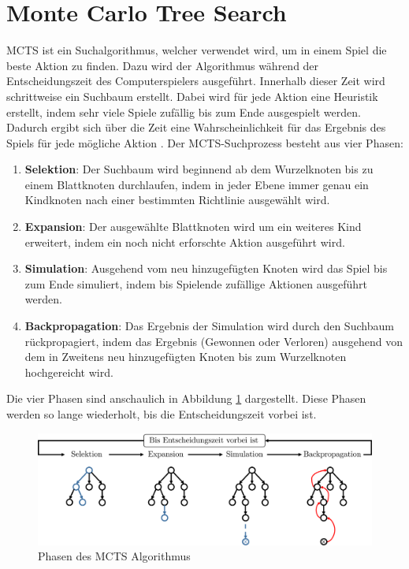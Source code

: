 \section{Monte Carlo Tree Search}
\label{chapter:monte-carlo-tree-search}

\acf{MCTS} ist ein Suchalgorithmus, welcher verwendet wird, um in einem Spiel die beste Aktion zu finden. Dazu wird der Algorithmus während der Entscheidungszeit des Computerspielers ausgeführt. Innerhalb dieser Zeit wird schrittweise ein Suchbaum erstellt. Dabei wird für jede Aktion eine Heuristik erstellt, indem sehr viele Spiele zufällig bis zum Ende ausgespielt werden. Dadurch ergibt sich über die Zeit eine Wahrscheinlichkeit für das Ergebnis des Spiels für jede mögliche Aktion \cite[S. 61]{2008.ParallelMCTS}. Der \ac{MCTS}-Suchprozess besteht aus vier Phasen:

\begin{enumerate}
    \item \textbf{Selektion}: Der Suchbaum wird beginnend ab dem Wurzelknoten bis zu einem Blattknoten durchlaufen, indem in jeder Ebene immer genau ein Kindknoten nach einer bestimmten Richtlinie ausgewählt wird. \cite[S. 187]{2018.ReinforcementLearning}
    \item \textbf{Expansion}: Der ausgewählte Blattknoten wird um ein weiteres Kind erweitert, indem ein noch nicht erforschte Aktion ausgeführt wird. \cite[S. 61]{2008.ParallelMCTS}
    \item \textbf{Simulation}: Ausgehend vom neu hinzugefügten Knoten wird das Spiel bis zum Ende simuliert, indem bis Spielende zufällige Aktionen ausgeführt werden. \cite[S. 61]{2008.ParallelMCTS}
    \item \textbf{Backpropagation}: Das Ergebnis der Simulation wird durch den Suchbaum rückpropagiert, indem das Ergebnis (Gewonnen oder Verloren) ausgehend von dem in Zweitens neu hinzugefügten Knoten bis zum Wurzelknoten hochgereicht wird. \cite[S. 187]{2018.ReinforcementLearning}
\end{enumerate}

Die vier Phasen sind anschaulich in Abbildung \ref{fig:mcts-phases} dargestellt. Diese Phasen werden so lange wiederholt, bis die Entscheidungszeit vorbei ist.

\begin{figure}[!ht]
    \centering
    \includegraphics[width=\textwidth]{res/pictures/mcts-phases.pdf}
    \caption{Phasen des \acs{MCTS} Algorithmus}
    \label{fig:mcts-phases}
\end{figure}

